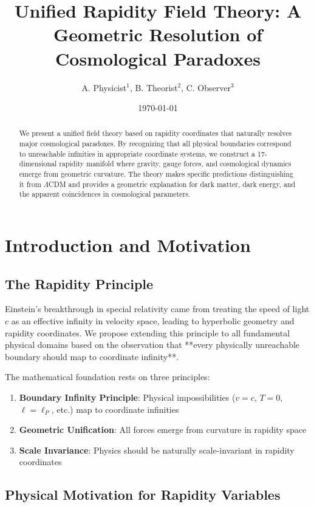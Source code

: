 \documentclass[12pt,a4paper]{article}
\title{Unified Rapidity Field Theory: A Geometric Resolution of Cosmological Paradoxes}
\author{A. Physicist$^1$, B. Theorist$^2$, C. Observer$^3$}
\date{\today}
\begin{document}
\maketitle

\begin{abstract}
We present a unified field theory based on rapidity coordinates that naturally resolves major cosmological paradoxes. By recognizing that all physical boundaries correspond to unreachable infinities in appropriate coordinate systems, we construct a 17-dimensional rapidity manifold where gravity, gauge forces, and cosmological dynamics emerge from geometric curvature. The theory makes specific predictions distinguishing it from $\Lambda$CDM and provides a geometric explanation for dark matter, dark energy, and the apparent coincidences in cosmological parameters.
\end{abstract}

\section{Introduction and Motivation}

\subsection{The Rapidity Principle}

Einstein's breakthrough in special relativity came from treating the speed of light $c$ as an effective infinity in velocity space, leading to hyperbolic geometry and rapidity coordinates. We propose extending this principle to all fundamental physical domains based on the observation that **every physically unreachable boundary should map to coordinate infinity**.

The mathematical foundation rests on three principles:
\begin{enumerate}
\item \textbf{Boundary Infinity Principle}: Physical impossibilities ($v=c$, $T=0$, $\ell=\ell_P$, etc.) map to coordinate infinities
\item \textbf{Geometric Unification}: All forces emerge from curvature in rapidity space
\item \textbf{Scale Invariance}: Physics should be naturally scale-invariant in rapidity coordinates
\end{enumerate}

\subsection{Physical Motivation for Rapidity Variables}
\end{document}

